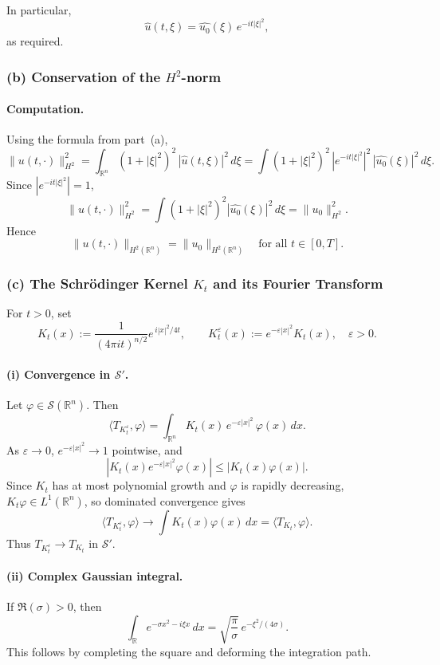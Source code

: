 \documentclass[12pt,a4paper]{article}
\theoremstyle{plain}
\theoremstyle{definition}
\theoremstyle{remark}
\theoremstyle{remark}
\begin{document}
\medskip
In particular,
\[
\widehat{u}(t,\xi) = \widehat{u_0}(\xi)\,e^{-it|\xi|^2},
\]
as required.

\subsubsection*{(b) \; Conservation of the $H^2$-norm}

\paragraph{\textbf{Computation.}}
Using the formula from part~(a),
\[
\|u(t,\cdot)\|_{H^2}^2
= \int_{\mathbb{R}^n} (1+|\xi|^2)^2\,|\widehat{u}(t,\xi)|^2\,d\xi
= \int (1+|\xi|^2)^2\,|e^{-it|\xi|^2}|^2\,|\widehat{u_0}(\xi)|^2\,d\xi.
\]
Since $|e^{-it|\xi|^2}|=1$,
\[
\|u(t,\cdot)\|_{H^2}^2
= \int (1+|\xi|^2)^2 |\widehat{u_0}(\xi)|^2\,d\xi
= \|u_0\|_{H^2}^2.
\]
Hence
\[
\|u(t,\cdot)\|_{H^2(\mathbb{R}^n)} = \|u_0\|_{H^2(\mathbb{R}^n)}
\quad \text{for all } t\in[0,T].
\]

\subsubsection*{(c) \; The Schrödinger Kernel $K_t$ and its Fourier Transform}

For $t>0$, set
\[
K_t(x) := \frac{1}{(4\pi i t)^{n/2}} e^{\, i|x|^2 /4t},
\qquad
K_t^\varepsilon(x) := e^{-\varepsilon|x|^2}K_t(x),\quad \varepsilon>0.
\]

\paragraph{\textbf{(i) Convergence in $\mathscr{S}'$.}}
Let $\varphi\in\mathscr{S}(\mathbb{R}^n)$. Then
\[
\langle T_{K_t^\varepsilon},\varphi\rangle
= \int_{\mathbb{R}^n} K_t(x)\,e^{-\varepsilon|x|^2}\,\varphi(x)\,dx.
\]
As $\varepsilon\to0$, $e^{-\varepsilon|x|^2}\to1$ pointwise, and
\[
|K_t(x)e^{-\varepsilon|x|^2}\varphi(x)|
\le |K_t(x)\varphi(x)|.
\]
Since $K_t$ has at most polynomial growth and $\varphi$ is rapidly
decreasing, $K_t\varphi\in L^1(\mathbb{R}^n)$, so dominated convergence
gives
\[
\langle T_{K_t^\varepsilon},\varphi\rangle
\longrightarrow \int K_t(x)\varphi(x)\,dx
= \langle T_{K_t},\varphi\rangle.
\]
Thus $T_{K_t^\varepsilon}\to T_{K_t}$ in $\mathscr{S}'$.

\paragraph{\textbf{(ii) Complex Gaussian integral.}}
If $\Re(\sigma)>0$, then
\[
\int_{\mathbb{R}} e^{-\sigma x^2 - i\xi x}\,dx
= \sqrt{\frac{\pi}{\sigma}}\, e^{-\xi^2/(4\sigma)}.
\]
This follows by completing the square and deforming the integration path.
\end{document}
